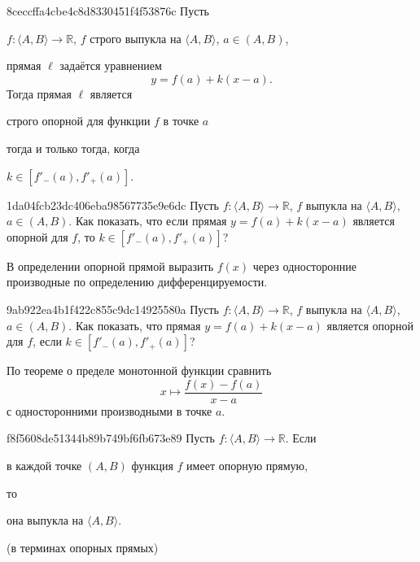 \begin{note}{8ceccffa4cbe4c8d8330451f4f53876c}
    Пусть \begin{icloze}{4}\( f : \langle A, B \rangle \to \mathbb R  \), \( f \) строго выпукла на \( \langle A, B \rangle  \), \( a \in (A, B) \),\end{icloze} прямая \( \ell \) задаётся уравнением
    \[
        y = f(a) + k(x - a).
    \]
    Тогда прямая \( \ell  \) является \begin{icloze}{1}строго опорной для функции \( f \) в точке \( a \)\end{icloze} \begin{icloze}{3}тогда и только тогда, когда\end{icloze} \begin{icloze}{2}\( k \in [f'_-(a), f'_+(a)]\).\end{icloze}
\end{note}

\begin{note}{1da04fcb23dc406eba98567735e9e6dc}
    Пусть \({ f : \langle A, B \rangle \to \mathbb R }\), \({ f }\) выпукла на \({ \langle A, B \rangle }\), \({ a \in (A, B) }\).
    Как показать, что если прямая \( y = f(a) + k(x - a) \) является опорной для \({ f }\), то \({ k \in [f'_-(a), f'_+(a)] }\)?

    \begin{cloze}{1}
        В определении опорной прямой выразить \({ f(x) }\) через односторонние производные по определению дифференцируемости.
    \end{cloze}
\end{note}

\begin{note}{9ab922ea4b1f422c855c9dc14925580a}
    Пусть \({ f : \langle A, B \rangle \to \mathbb R }\), \({ f }\) выпукла на \({ \langle A, B \rangle }\), \({ a \in (A, B) }\).
    Как показать, что прямая \( y = f(a) + k(x - a) \) является опорной для \({ f }\), если \({ k \in [f'_-(a), f'_+(a)] }\)?

    \begin{cloze}{1}
        По теореме о пределе монотонной функции сравнить
        \[
            x \mapsto \frac{f(x) - f(a)}{x - a}
        \]
        с односторонними производными в точке \({ a }\).
    \end{cloze}
\end{note}

\begin{note}{f8f5608de51344b89b749bf6fb673e89}
    Пусть \({ f : \langle A, B \rangle \to \mathbb R }\).
    Если \begin{icloze}{2}в каждой точке \({ (A, B) }\) функция \({ f }\) имеет опорную прямую,\end{icloze} то \begin{icloze}{1}она выпукла на \({ \langle A, B \rangle }\).\end{icloze}

    \begin{center}
        \tiny
        (в терминах опорных прямых)
    \end{center}
\end{note}

